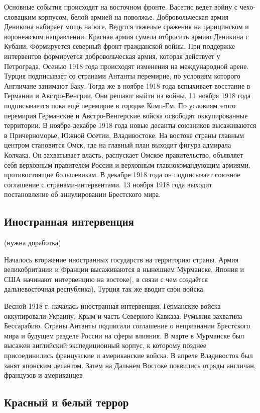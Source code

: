 Основные события происходят на восточном фронте. Васетис ведет войну с чехо-словацким корпусом, белой армией на поволжье.
Добровольческая армия Деникина набирает мощь на юге. 
Ведутся тяжелые сражения на царицинском и воронежском направлении. Красная армия сумела отбросить армию Деникина с Кубани.
Формируется северный фронт гражданской войны. При поддержке интервентов формируется добровольческая армия, которая действует у Петрограда.
Осенью 1918 года происходят изменения на международной арене. Турция подписывает со странами Антанты перемирие, по условиям которого Англичане занимают Баку. Тогда же в ноябре 1918 года вспыхивает восстание в Германии и Австро-Венгрии. Они решают выйти из войны. 11 ноября 1918 года подписывается пока ещё перемирие в городке Комп-Ем. По условиям этого перемирия Германские и Австро-Венгерские войска освободят оккупированные территории.
В ноябре-декабре 1918 года новые десанты союзников высаживаются в Причерноморье, Южной Осетии, Владивостоке.
На востоке страны главным центром становится Омск, где на главный план выходит фигура адмирала Колчака. Он захватывает власть, распускает Омское правительство, объявляет себя верховным правителем России и верховным главнокомандующим армиями, противостоящие большевикам. В декабре 1918 года он подписывает союзное соглашение с странами-интервентами.
13 ноября 1918 года выходит постановление об аннулировании Брестского мира.

\subsection{Иностранная интервенция} (нужна доработка)

Началось вторжение иностранных государств на территорию страны. Армия великобритании и Франции высаживаются в нынешнем Мурманске, Япония и США начинают интервенцию на востоке(, в связи с чем создаётся дальневосточная республика), Турция так же вводит свои войска.

Весной 1918 г. началась иностранная интервенция. Германские войска оккупировали
Украину, Крым и часть Северного Кавказа. Румыния захватила Бессарабию. Страны Антанты
подписали соглашение о непризнании Брестского мира и будущем разделе России на сферы
влияния. В марте в Мурманске был высажен английский экспедиционный корпус, к которому
позднее присоединились французские и американские войска. В апреле Владивосток был занят
японским десантом. Затем на Дальнем Востоке появились отряды англичан, французов и
американцев

\subsection{Красный и белый террор}

